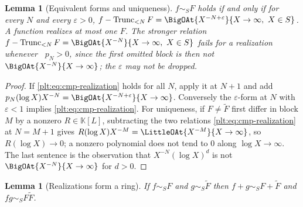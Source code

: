 \documentclass[11pt,oneside]{article}
\theoremstyle{plain}
\newtheorem{lemma}[theorem]{Lemma}
\theoremstyle{definition}
\theoremstyle{remark}
\newcommand{\K}{\mathbb{K}}
\DeclareMathOperator{\degL}{deg_{L}}
\newcommand{\Trunc}[2]{\operatorname{Trunc}_{<#2}#1}     %
\begin{document}
\begin{lemma}[Equivalent forms and uniqueness]\label{plt:lem:cmp-realization-basic}
\(f\sim_{S}F\) holds if and only if for every \(N\) and every
\(\varepsilon>0\),
\(f-\Trunc{F}{N}=\BigOAt{X^{-N+\varepsilon}}{X\to\infty,\ X\in S}\).  A
function realizes at most one \(F\).  The stronger relation
\(f-\Trunc{F}{N}=\BigOAt{X^{-N}}{X\to\infty,\ X\in S}\) \emph{fails} for a
realization whenever \(\degL p_{N}>0\), since the first omitted block is then
not \(\BigOAt{X^{-N}}{X\to\infty}\); the \(\varepsilon\) may not be dropped.
\end{lemma}

\begin{proof}
If \eqref{plt:eq:cmp-realization} holds for all \(N\), apply it at \(N+1\) and
add \(p_{N}(\log X)X^{-N}=\BigOAt{X^{-N+\varepsilon}}{X\to\infty}\).
Conversely the \(\varepsilon\)-form at \(N\) with \(\varepsilon<1\) implies
\eqref{plt:eq:cmp-realization}.  For uniqueness, if \(F\ne\tilde F\) first
differ in block \(M\) by a nonzero \(R\in\K[L]\), subtracting the two
relations \eqref{plt:eq:cmp-realization} at \(N=M+1\) gives
\(R(\log X)X^{-M}=\LittleOAt{X^{-M}}{X\to\infty}\), so
\(R(\log X)\to0\); a nonzero polynomial does not tend to \(0\) along
\(\log X\to\infty\).  The last sentence is the observation that
\(X^{-N}(\log X)^{d}\) is not \(\BigOAt{X^{-N}}{X\to\infty}\) for \(d>0\).
\end{proof}

\begin{lemma}[Realizations form a ring]\label{plt:lem:cmp-realization-ring}
If \(f\sim_{S}F\) and \(g\sim_{S}\tilde F\) then \(f+g\sim_{S}F+\tilde F\) and
\(fg\sim_{S}F\tilde F\).
\end{lemma}
\end{document}
